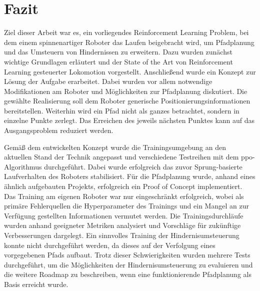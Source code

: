 \chapter{Fazit}
Ziel dieser Arbeit war es, ein vorliegendes Reinforcement Learning Problem, bei dem einem spinnenartiger Roboter das Laufen beigebracht wird, um Pfadplanung und das Umsteuern von Hindernissen zu erweitern.
Dazu wurden zunächst wichtige Grundlagen erläutert und der State of the Art von Reinforcement Learning gesteuerter Lokomotion vorgestellt.
Anschließend wurde ein Konzept zur Lösung der Aufgabe erarbeitet.
Dabei wurden vor allem notwendige Modifikationen am Roboter und Möglichkeiten zur Pfadplanung diskutiert.
Die gewählte Realisierung soll dem Roboter generische Positionierungsinformationen bereitstellen.
Weiterhin wird ein Pfad nicht als ganzes betrachtet, sondern in einzelne Punkte zerlegt.
Das Erreichen des jeweils nächsten Punktes kann auf das Ausgangsproblem reduziert werden.

Gemäß dem entwickelten Konzept wurde die Trainingsumgebung an den aktuellen Stand der Technik angepasst und verschiedene Testreihen mit dem \acl{ppo}-Algorithmus durchgeführt.
Dabei wurde erfolgreich das zuvor Sprung-basierte Laufverhalten des Roboters stabilisiert.
Für die Pfadplanung wurde, anhand eines ähnlich aufgebauten Projekts, erfolgreich ein Proof of Concept implementiert.
Das Training am eigenen Roboter war nur eingeschränkt erfolgreich, wobei als primäre Fehlerquellen die Hyperparameter des Trainings und ein Mangel an zur Verfügung gestellten Informationen vermutet werden.
Die Trainingsdurchläufe wurden anhand geeigneter Metriken analysiert und Vorschläge für zukünftige Verbesserungen dargelegt.
Ein sinnvolles Training der Hindernisumsteuerung konnte nicht durchgeführt werden, da dieses auf der Verfolgung eines vorgegebenen Pfads aufbaut.
Trotz dieser Schwierigkeiten wurden mehrere Tests durchgeführt, um die Möglichkeiten der Hindernisumsteuerung zu evaluieren und die weitere Roadmap zu beschreiben, wenn eine funktionierende Pfadplanung als Basis erreicht wurde.
